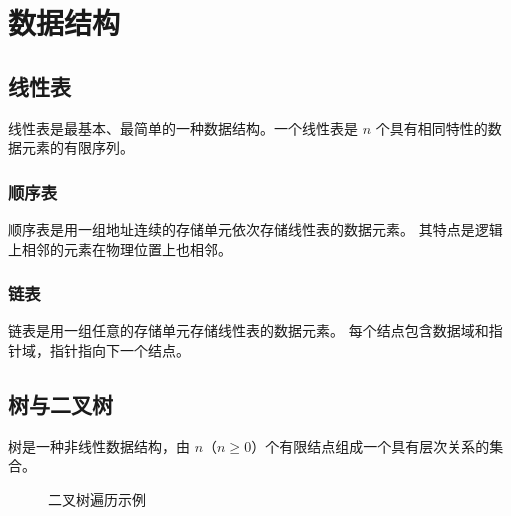 \chapter{数据结构}

\section{线性表}

线性表是最基本、最简单的一种数据结构。一个线性表是 $n$ 个具有相同特性的数据元素的有限序列。

\subsection{顺序表}

顺序表是用一组地址连续的存储单元依次存储线性表的数据元素。
其特点是逻辑上相邻的元素在物理位置上也相邻。

\subsection{链表}

链表是用一组任意的存储单元存储线性表的数据元素。
每个结点包含数据域和指针域，指针指向下一个结点。


\section{树与二叉树}

树是一种非线性数据结构，由 $n$（$n \geq 0$）个有限结点组成一个具有层次关系的集合。

\begin{figure}[htbp]
    \centering
    \caption{二叉树遍历示例}
    \label{fig:tree}
\end{figure}
